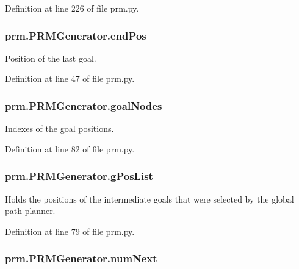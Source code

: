 Definition at line 226 of file prm.\-py.

\hypertarget{classprm_1_1PRMGenerator_a8925b6d51130804d23bb82d3b8602d74}{
\subsubsection[{end\-Pos}]{\setlength{\rightskip}{0pt plus 5cm}prm.\-P\-R\-M\-Generator.\-end\-Pos}}\label{classprm_1_1PRMGenerator_a8925b6d51130804d23bb82d3b8602d74}


Position of the last goal. 



Definition at line 47 of file prm.\-py.

\hypertarget{classprm_1_1PRMGenerator_af39d8001704a7437e6255ef4ca69189c}{
\subsubsection[{goal\-Nodes}]{\setlength{\rightskip}{0pt plus 5cm}prm.\-P\-R\-M\-Generator.\-goal\-Nodes}}\label{classprm_1_1PRMGenerator_af39d8001704a7437e6255ef4ca69189c}


Indexes of the goal positions. 



Definition at line 82 of file prm.\-py.

\hypertarget{classprm_1_1PRMGenerator_a164c6ae962a75ed31d58eff1db95f141}{
\subsubsection[{g\-Pos\-List}]{\setlength{\rightskip}{0pt plus 5cm}prm.\-P\-R\-M\-Generator.\-g\-Pos\-List}}\label{classprm_1_1PRMGenerator_a164c6ae962a75ed31d58eff1db95f141}


Holds the positions of the intermediate goals that were selected by the global path planner. 



Definition at line 79 of file prm.\-py.

\hypertarget{classprm_1_1PRMGenerator_a84795d8a1191caae0612ac645d8853b9}{
\subsubsection[{num\-Next}]{\setlength{\rightskip}{0pt plus 5cm}prm.\-P\-R\-M\-Generator.\-num\-Next}}\label{classprm_1_1PRMGenerator_a84795d8a1191caae0612ac645d8853b9}


